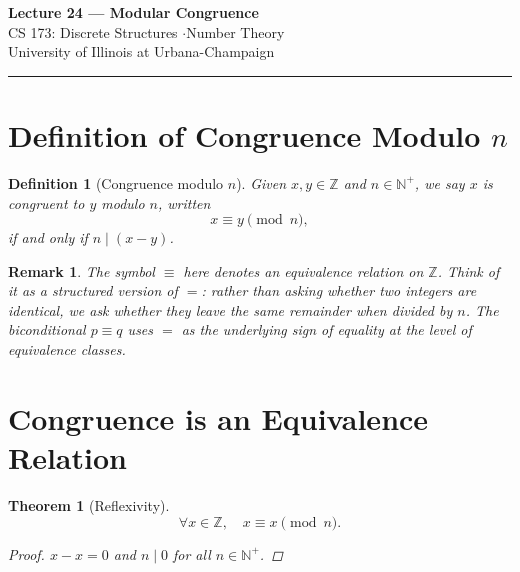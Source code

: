 \documentclass[11pt]{article}
\theoremstyle{defstyle}
\newtheorem{definition}{Definition}[section]
\theoremstyle{thmstyle}
\newtheorem{theorem}{Theorem}[section]
\theoremstyle{notstyle}
\newtheorem*{remark}{Remark}
\theoremstyle{cautionstyle}
\newcommand{\Z}{\mathbb{Z}}
\newcommand{\N}{\mathbb{N}}
\begin{document}
\begin{center}
  {\Large\bfseries Lecture 24 --- Modular Congruence}\\[4pt]
  {\normalsize CS 173: Discrete Structures \quad$\cdot$\quad Number Theory}\\[2pt]
  {\small\color{gray} University of Illinois at Urbana-Champaign}
\end{center}

\vspace{1em}
\hrule
\vspace{1.5em}

\section{Definition of Congruence Modulo \texorpdfstring{$n$}{n}}

\begin{defbox}
\begin{definition}[Congruence modulo $n$]
Given $x, y \in \Z$ and $n \in \N^+$, we say $x$ is \emph{congruent to $y$ modulo $n$}, written
\[
  x \equiv y \pmod{n},
\]
if and only if $n \mid (x - y)$.
\end{definition}
\end{defbox}

\begin{notebox}
\begin{remark}
The symbol $\equiv$ here denotes an \emph{equivalence relation} on $\Z$.  Think of it as a structured version of $=$: rather than asking whether two integers are identical, we ask whether they leave the same remainder when divided by $n$.  The biconditional $p \equiv q$ uses $=$ as the underlying sign of equality at the level of equivalence classes.
\end{remark}
\end{notebox}

\section{Congruence is an Equivalence Relation}

\begin{thmbox}
\begin{theorem}[Reflexivity]
\[
  \forall x \in \Z,\quad x \equiv x \pmod{n}.
\]
\begin{proof}
$x - x = 0$ and $n \mid 0$ for all $n \in \N^+$.
\end{proof}
\end{theorem}
\end{thmbox}
\end{document}
